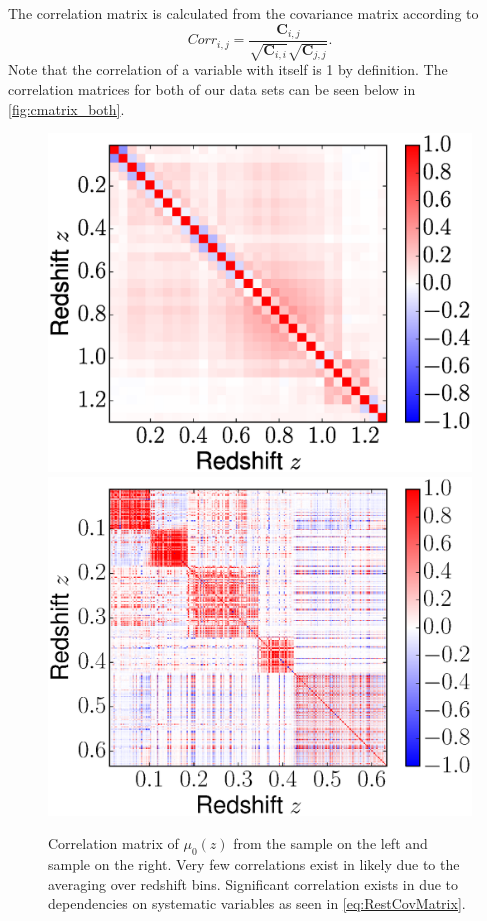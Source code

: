 \documentclass[12pt,a4paper]{article}
\begin{document}
The correlation matrix is calculated from the covariance matrix according to
%
\begin{equation}
  \label{eq:correlation}
  Corr_{i,j} = \frac{\mathbf{C}_{i,j}}{\sqrt{\mathbf{C}_{i,i}}\sqrt{\mathbf{C}_{j,j}}}.
\end{equation}
%
Note that the correlation of a variable with itself is 1 by definition.
The correlation matrices for both of our data sets can be seen below in
\autoref{fig:cmatrix_both}.
%
\begin{figure}
  \includegraphics[width=0.5\linewidth]{figures/Betoule_correlation.eps}
  \includegraphics[width=0.5\linewidth]{figures/Rest_correlation.eps}
  \caption{Correlation matrix of $\mu_0(z)$ from the
    \citet{betoule2014} sample on the left and \citet{rest2014} sample 
    on the right. Very few correlations exist in \citet{betoule2014} likely 
    due to the averaging over redshift bins. Significant correlation exists in 
    \citet{rest2014} due to dependencies on systematic variables
    as seen in \autoref{eq:RestCovMatrix}.}
%
  \label{fig:cmatrix_both}
\end{figure}
\end{document}
